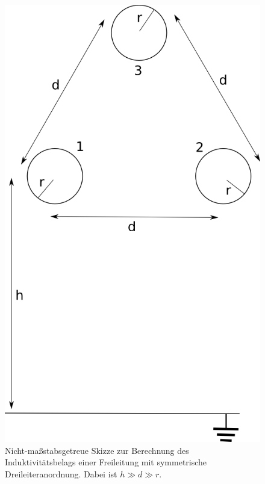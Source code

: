 \begin{figure}[bthn]
\begin{center}
\noindent
\includegraphics[scale=0.3]{leitungsreaktanz.png}
\end{center}
\caption{Nicht-maßstabsgetreue Skizze zur Berechnung des Induktivitätsbelags einer Freileitung mit symmetrische Dreileiteranordnung. Dabei ist $h \gg d \gg r$.} 
\label{pic:leitungsreaktanz} 
\end{figure}

